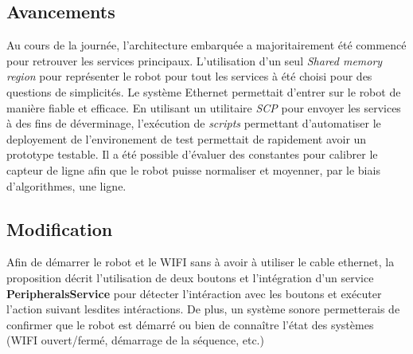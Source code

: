 \subsection{Avancements}
Au cours de la journée, l'architecture embarquée a majoritairement été commencé pour retrouver les services principaux.
L'utilisation d'un seul \textit{Shared memory region} pour représenter le robot pour tout les services à été choisi pour des questions de simplicités.
Le système Ethernet permettait d'entrer sur le robot de manière fiable et efficace.
En utilisant un utilitaire \textit{SCP} pour envoyer les services à des fins de déverminage, l'exécution de \textit{scripts} permettant d'automatiser le deployement de l'environement de test permettait de rapidement avoir un prototype testable.
Il a été possible d'évaluer des constantes pour calibrer le capteur de ligne afin que le robot puisse normaliser et moyenner, par le biais d'algorithmes, une ligne.

\subsection{Modification}
Afin de démarrer le robot et le WIFI sans à avoir à utiliser le cable ethernet, la proposition décrit l'utilisation de deux boutons et l'intégration d'un service \textbf{PeripheralsService} pour détecter l'intéraction avec les boutons et exécuter l'action suivant lesdites intéractions.
De plus, un système sonore permetterais de confirmer que le robot est démarré ou bien de connaître l'état des systèmes (WIFI ouvert/fermé, démarrage de la séquence, etc.)
